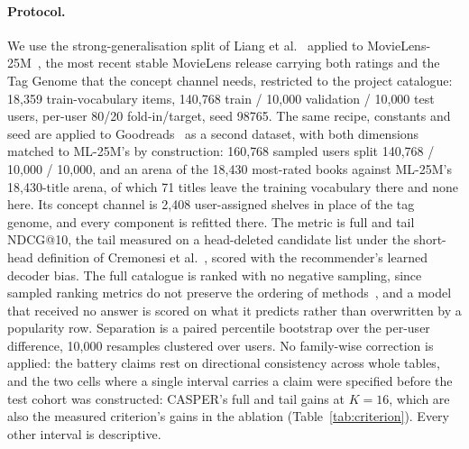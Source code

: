 \documentclass[runningheads]{llncs}
\begin{document}
\paragraph{Protocol.}
We use the strong-generalisation split of Liang et al.~\cite{liang2018variational} applied to
MovieLens-25M~\cite{harper2015movielens}, the most recent stable MovieLens release carrying both
ratings and the Tag Genome that the concept channel needs, restricted to the project catalogue: 18{,}359
train-vocabulary items, 140{,}768 train / 10{,}000 validation / 10{,}000 test users, per-user 80/20
fold-in/target, seed 98765. The same recipe, constants and seed are applied to
Goodreads~\cite{wan2018goodreads} as a second dataset, with both dimensions matched to ML-25M's by
construction: 160{,}768 sampled users split 140{,}768 / 10{,}000 / 10{,}000, and an arena of the
18{,}430 most-rated books against ML-25M's 18{,}430-title arena, of which 71 titles leave the
training vocabulary there and none here. Its concept channel is 2{,}408 user-assigned shelves in
place of the tag genome, and every component is refitted there. The metric is full and tail NDCG@10, the tail measured on a head-deleted
candidate list under the short-head definition of Cremonesi et al.~\cite{cremonesi2010performance},
scored with the recommender's learned decoder bias. The full catalogue is ranked with no negative
sampling, since sampled ranking metrics do not preserve the ordering of
methods~\cite{krichene2020sampled}, and a model that received no answer is scored on what it predicts
rather than overwritten by a popularity row. Separation is a paired
percentile bootstrap over the per-user difference, 10{,}000 resamples clustered over users. No
family-wise correction is applied: the battery claims rest on directional consistency across whole
tables, and the two cells where a single interval carries a claim were specified before the test
cohort was constructed: CASPER's full and tail gains at $K{=}16$, which are also the measured
criterion's gains in the ablation (Table~\ref{tab:criterion}). Every other interval is descriptive.
\end{document}
